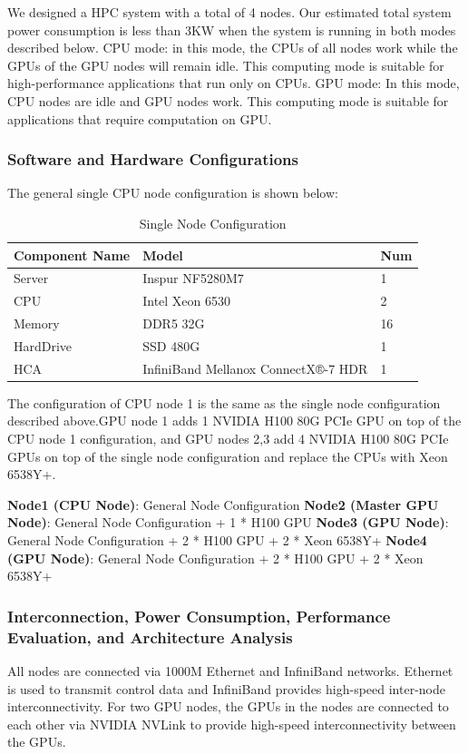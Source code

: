 \documentclass[a4paper,12pt]{article}
\begin{document}
We designed a HPC system with a total of 4 nodes. Our estimated total system power consumption is less than 3KW when the system is running in both modes described below.
CPU mode: in this mode, the CPUs of all nodes work while the GPUs of the GPU nodes will remain idle. This computing mode is suitable for high-performance applications that run only on CPUs.
GPU mode: In this mode, CPU nodes are idle and GPU nodes work. This computing mode is suitable for applications that require computation on GPU.

\subsubsection{Software and Hardware Configurations}
The general single CPU node configuration is shown below:
\begin{table}[H]
\centering
\caption{Single Node Configuration}
\begin{tabular}{|l|l|l|}
\hline
Component Name & Model & Num \\
\hline
Server & Inspur NF5280M7 & 1 \\
\hline
CPU & Intel Xeon 6530 & 2 \\
\hline
Memory & DDR5 32G & 16 \\
\hline
HardDrive & SSD 480G & 1 \\
\hline
HCA & InfiniBand Mellanox ConnectX®-7 HDR & 1 \\
\hline
\end{tabular}
\end{table}

The configuration of CPU node 1 is the same as the single node configuration described above.GPU node 1 adds 1 NVIDIA H100 80G PCIe GPU on top of the CPU node 1 configuration, and GPU nodes 2,3 add 4 NVIDIA H100 80G PCIe GPUs on top of the single node configuration and replace the CPUs with Xeon 6538Y+.

\textbf{Node1 (CPU Node)}: General Node Configuration
\textbf{Node2 (Master GPU Node)}: General Node Configuration + 1 * H100 GPU
\textbf{Node3 (GPU Node)}: General Node Configuration + 2 * H100 GPU + 2 * Xeon 6538Y+
\textbf{Node4 (GPU Node)}: General Node Configuration + 2 * H100 GPU + 2 * Xeon 6538Y+

\subsubsection{Interconnection, Power Consumption, Performance Evaluation, and Architecture Analysis}
All nodes are connected via 1000M Ethernet and InfiniBand networks. Ethernet is used to transmit control data and InfiniBand provides high-speed inter-node interconnectivity. For two GPU nodes, the GPUs in the nodes are connected to each other via NVIDIA NVLink to provide high-speed interconnectivity between the GPUs.
\end{document}
